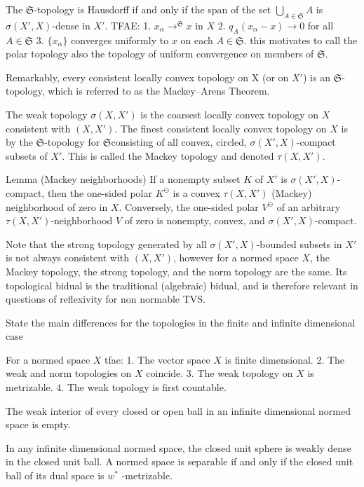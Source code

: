The \( \mathfrak{S} \)-topology is Hausdorff if and only if the
span of the set \( \bigcup_{A \in \mathfrak{S}} A \) is \( \sigma(X', X) \)-dense in \( X' \). 
TFAE:
1. \( x_\alpha \to^{\mathfrak{S}} x \) in \( X \) 
2. \( q_A(x_\alpha − x) \to 0 \) for all \( A \in \mathfrak{S} \)
3. \( \{x_\alpha\} \) converges uniformly to \( x \) on each \( A \in \mathfrak{S} \).
this motivates to call the polar topology also the topology of uniform convergence on members of \( \mathfrak{S} \).

Remarkably, every consistent locally convex topology on X (or on \( X' \)) is an \( \mathfrak{S} \)-topology,
which is referred to as the Mackey–Arens Theorem.

The weak topology \( \sigma(X, X') \) is the coarsest locally convex topology on \( X \) consistent with 
\( (X, X') \). The finest consistent locally convex topology on \( X \) is by the \( \mathfrak{S} \)-topology for 
\( \mathfrak{S} \)consisting of all convex, circled, \( \sigma(X', X) \)-compact subsets of \( X' \). 
This is called the Mackey topology and denoted \( \tau(X, X') \).

Lemma (Mackey neighborhoods)  
If a nonempty subset \(K\) of \(X'\) is \(\sigma(X', X)\)-compact, 
then the one-sided polar \(K^{\ominus}\) is a convex \(\tau(X, X')\) (Mackey) neighborhood of zero in \(X\). 
Conversely, the one-sided polar \(V^{\ominus}\) of an arbitrary \(\tau(X, X')\)-neighborhood \(V\) of zero is 
nonempty, convex, and \(\sigma(X', X)\)-compact.

Note that the strong topology generated by all \( \sigma(X', X) \)-bounded subsets in \( X' \) is not always consistent with \( (X, X') \),
however for a normed space \( X \), the Mackey topology, the strong topology, and the norm topology are the same.
Its topological bidual is the traditional (algebraic) bidual, and is therefore relevant in questions of reflexivity for non normable TVS.


State the main differences for the topologies in the finite and infinite dimensional case 

For a normed space \( X \) tfae:
1. The vector space \( X \) is finite dimensional.
2. The weak and norm topologies on \( X \) coincide.
3. The weak topology on \( X \) is metrizable.
4. The weak topology is first countable.

The weak interior of every closed or open ball in an infinite dimensional normed space is empty.

In any infinite dimensional normed space, the closed unit sphere is weakly dense in the closed unit ball.
A normed space is separable if and only if the closed unit ball of its dual space is \( w^\ast \) -metrizable.

